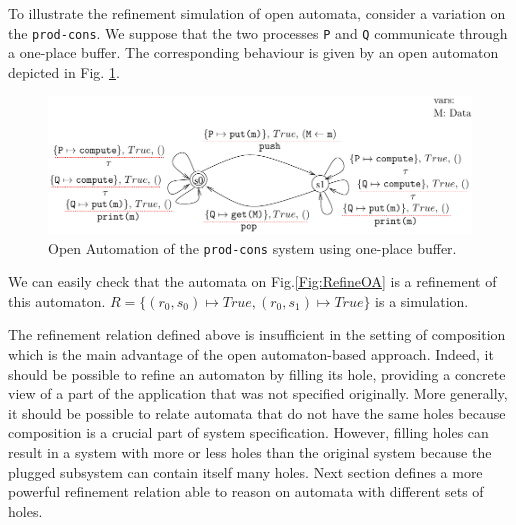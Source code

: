\documentclass[runningheads]{llncs}
\begin{document}
\begin{example} 
To illustrate the refinement simulation of open automata, consider a variation on the \texttt{prod-cons}.  We suppose that  the two processes  \texttt{P} and  \texttt{Q} communicate through a one-place  buffer. The  corresponding behaviour  is given by  an open automaton  depicted in Fig. \ref{Fig:SpecOA}. 
\begin{figure}[h]
 \centering
   \includegraphics[width=.90\textwidth]{Figures/FIFOpen2.pdf}
   \caption{Open Automation of the \texttt{prod-cons} system using one-place  buffer.  \label{Fig:SpecOA}}
\end{figure}
We can easily check that the automata on Fig.\ref{Fig:RefineOA} is a refinement of this automaton. $R=\{(r_0,s_0) \mapsto True, (r_0,s_1) \mapsto True \}$ is a simulation.
\end{example}



The refinement relation defined above is insufficient in the setting of composition which is the main advantage of the open automaton-based approach. Indeed, it should be possible to refine an automaton by filling its hole, providing a concrete view of a part of the application that was not specified originally. 
More generally, it should be possible to relate automata that do not have the same holes because composition is a crucial part of system specification.
However, filling holes can result in a system with more or less holes than the original system because the plugged subsystem can contain itself many holes.
Next section  defines  a more powerful refinement relation able to reason on automata with different sets of holes.


\end{document}
